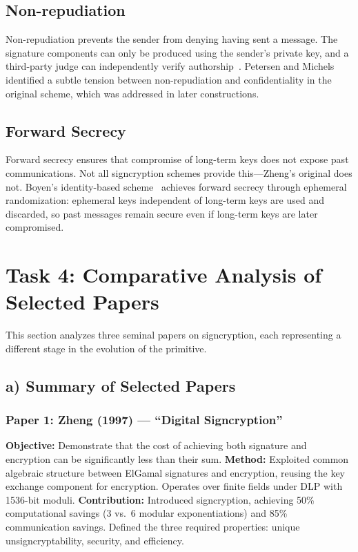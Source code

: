 \documentclass[11pt,a4paper]{article}
\begin{document}
\subsection{Non-repudiation}

Non-repudiation prevents the sender from denying having sent a message. The signature components can only be produced using the sender's private key, and a third-party judge can independently verify authorship~\cite{zheng1997}. Petersen and Michels~\cite{petersen1998} identified a subtle tension between non-repudiation and confidentiality in the original scheme, which was addressed in later constructions.

\subsection{Forward Secrecy}

Forward secrecy ensures that compromise of long-term keys does not expose past communications. Not all signcryption schemes provide this---Zheng's original does not. Boyen's identity-based scheme~\cite{boyen2003} achieves forward secrecy through ephemeral randomization: ephemeral keys independent of long-term keys are used and discarded, so past messages remain secure even if long-term keys are later compromised.

\section{Task 4: Comparative Analysis of Selected Papers}

This section analyzes three seminal papers on signcryption, each representing a different stage in the evolution of the primitive.

\subsection{a) Summary of Selected Papers}

\subsubsection{Paper 1: Zheng (1997) --- ``Digital Signcryption''~\cite{zheng1997}}

\textbf{Objective:} Demonstrate that the cost of achieving both signature and encryption can be significantly less than their sum.
\textbf{Method:} Exploited common algebraic structure between ElGamal signatures and encryption, reusing the key exchange component for encryption. Operates over finite fields under DLP with 1536-bit moduli.
\textbf{Contribution:} Introduced signcryption, achieving 50\% computational savings (3 vs.\ 6 modular exponentiations) and 85\% communication savings. Defined the three required properties: unique unsigncryptability, security, and efficiency.
\end{document}
